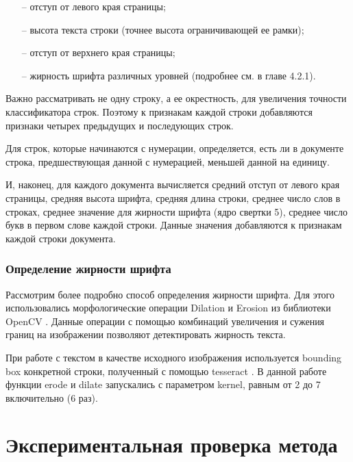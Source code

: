 \documentclass{ProcISPRAS}
\begin{document}
\begin{itemize}
  \begin{itemize}

    \item[--] отступ от левого края страницы;
    \item[--] высота текста строки (точнее высота ограничивающей ее рамки);
    \item[--] отступ от верхнего края страницы;
    \item[--] жирность шрифта различных уровней (подробнее см. в главе 4.2.1).
    
     \end{itemize}

\end{itemize}

Важно рассматривать не одну строку, а ее окрестность, для увеличения точности классификатора строк. Поэтому к признакам каждой строки добавляются признаки четырех предыдущих и последующих строк.

Для строк, которые начинаются с нумерации, определяется, есть ли в документе строка, предшествующая данной с нумерацией, меньшей данной на единицу.

И, наконец, для каждого документа вычисляется средний отступ от левого края страницы, средняя высота шрифта, средняя длина строки, среднее число слов в строках, среднее значение для жирности шрифта (ядро свертки 5), среднее число букв в первом слове каждой строки. Данные значения добавляются к признакам каждой строки документа.

\subsubsection{Определение жирности шрифта}
Рассмотрим более подробно способ определения жирности шрифта. Для этого использовались морфологические операции Dilation и Erosion \cite{operations} из библиотеки OpenCV \cite{opencv}. Данные операции с помощью комбинаций увеличения и сужения границ на изображении позволяют детектировать жирность текста.

При работе с текстом в качестве исходного изображения используется bounding box конкретной строки, полученный с помощью tesseract \cite{tesseract}. В данной работе функции erode и dilate запускались с параметром kernel, равным от 2 до 7 включительно (6 раз).

\section{Экспериментальная проверка метода}
\end{document}
